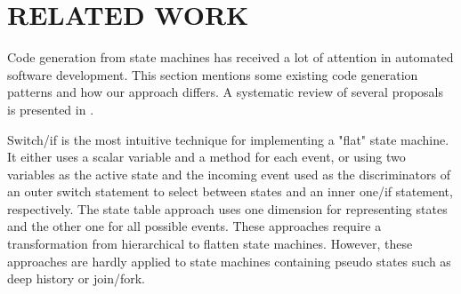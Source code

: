 \section{\uppercase{Related work}}
\label{sec:relatedwork}
Code generation from state machines has received a lot of attention in automated software development. 
This section mentions some existing code generation patterns and how our approach differs. 
A systematic review of several proposals is presented in \cite{Domnguez2012}. 


Switch/if is the most intuitive technique for implementing a "flat" state machine. 
It either uses a scalar variable \cite{Booch1998} and a method for each event, or using two variables as the active state and the incoming event used as the discriminators of an outer switch statement to select between states and an inner one/if statement, respectively. 
The state table approach \cite{Douglass1999} uses one dimension for representing states and the other one for all possible events. 
These approaches require a transformation from hierarchical to flatten state machines. 
However, these approaches are hardly applied to state machines containing pseudo states such as deep history or join/fork.  

